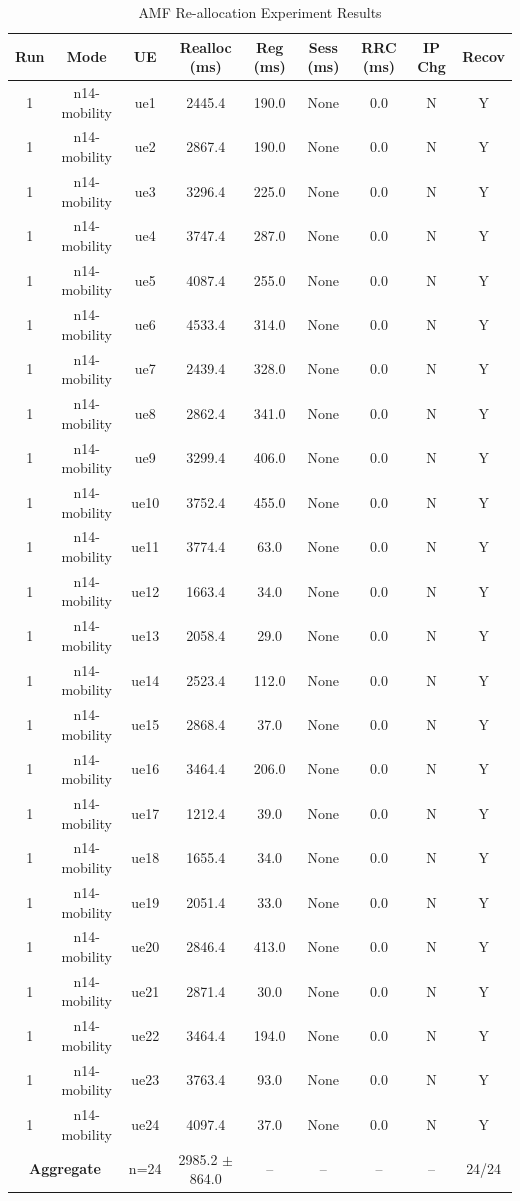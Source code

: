 \begin{table}[ht]
\centering
\begin{tabular}{|c|c|c|c|c|c|c|c|c|}
\hline
Run & Mode & UE & Realloc (ms) & Reg (ms) & Sess (ms) & RRC (ms) & IP Chg & Recov \\
\hline
1 & n14-mobility & ue1 & 2445.4 & 190.0 & None & 0.0 & N & Y \\
1 & n14-mobility & ue2 & 2867.4 & 190.0 & None & 0.0 & N & Y \\
1 & n14-mobility & ue3 & 3296.4 & 225.0 & None & 0.0 & N & Y \\
1 & n14-mobility & ue4 & 3747.4 & 287.0 & None & 0.0 & N & Y \\
1 & n14-mobility & ue5 & 4087.4 & 255.0 & None & 0.0 & N & Y \\
1 & n14-mobility & ue6 & 4533.4 & 314.0 & None & 0.0 & N & Y \\
1 & n14-mobility & ue7 & 2439.4 & 328.0 & None & 0.0 & N & Y \\
1 & n14-mobility & ue8 & 2862.4 & 341.0 & None & 0.0 & N & Y \\
1 & n14-mobility & ue9 & 3299.4 & 406.0 & None & 0.0 & N & Y \\
1 & n14-mobility & ue10 & 3752.4 & 455.0 & None & 0.0 & N & Y \\
1 & n14-mobility & ue11 & 3774.4 & 63.0 & None & 0.0 & N & Y \\
1 & n14-mobility & ue12 & 1663.4 & 34.0 & None & 0.0 & N & Y \\
1 & n14-mobility & ue13 & 2058.4 & 29.0 & None & 0.0 & N & Y \\
1 & n14-mobility & ue14 & 2523.4 & 112.0 & None & 0.0 & N & Y \\
1 & n14-mobility & ue15 & 2868.4 & 37.0 & None & 0.0 & N & Y \\
1 & n14-mobility & ue16 & 3464.4 & 206.0 & None & 0.0 & N & Y \\
1 & n14-mobility & ue17 & 1212.4 & 39.0 & None & 0.0 & N & Y \\
1 & n14-mobility & ue18 & 1655.4 & 34.0 & None & 0.0 & N & Y \\
1 & n14-mobility & ue19 & 2051.4 & 33.0 & None & 0.0 & N & Y \\
1 & n14-mobility & ue20 & 2846.4 & 413.0 & None & 0.0 & N & Y \\
1 & n14-mobility & ue21 & 2871.4 & 30.0 & None & 0.0 & N & Y \\
1 & n14-mobility & ue22 & 3464.4 & 194.0 & None & 0.0 & N & Y \\
1 & n14-mobility & ue23 & 3763.4 & 93.0 & None & 0.0 & N & Y \\
1 & n14-mobility & ue24 & 4097.4 & 37.0 & None & 0.0 & N & Y \\
\multicolumn{2}{|c|}{\textbf{Aggregate}} & n=24 & 2985.2 $\pm$ 864.0 & -- & -- & -- & -- & 24/24 \\
\hline
\end{tabular}
\caption{AMF Re-allocation Experiment Results}
\label{tab:amf_realloc}
\end{table}
